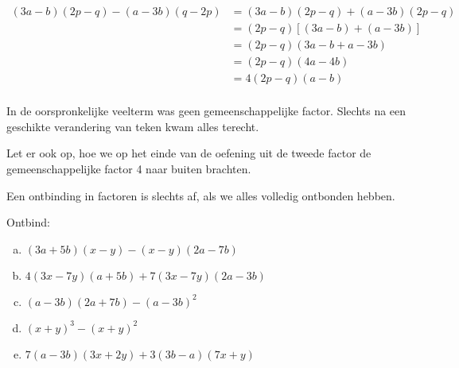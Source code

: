 \documentclass[12pt]{article}
\begin{document}
\begin{voorbeeld}
\begin{align*}
(3a - b) (2p - q) - (a - 3b) (q - 2p)
&= (3a - b) (2p - q) + (a - 3b) (2p - q)\\
&= (2p - q) [(3a - b) + (a - 3b)]\\
&= (2p - q) (3a - b + a- 3b)\\
&= (2p - q) (4a - 4b)\\
&= 4 (2p- q) (a - b)\\
\end{align*}

In de oorspronkelijke veelterm was geen gemeenschappelijke factor. Slechts na een geschikte verandering van teken kwam alles terecht.

Let er ook op, hoe we op het einde van de oefening uit de tweede factor de gemeenschappelijke factor 4 naar buiten brachten.
\end{voorbeeld}

Een ontbinding in factoren is slechts af, als we alles volledig ontbonden hebben.

\begin{exercise}
Ontbind:
\begin{enumerate}[(a)]
  \item $(3a + 5b) (x - y) - (x - y) (2a - 7b)$
  \item $4 (3x - 7y) (a + 5b) + 7 (3x - 7y) (2a - 3b)$
  \item $(a - 3b) (2a + 7b) - (a - 3b)^2$
  \item $(x + y)^3 - (x + y)^2$
  \item $7 (a - 3b) (3x + 2y) + 3 (3b - a) (7x + y)$
\end{enumerate}
\end{exercise}
\end{document}
